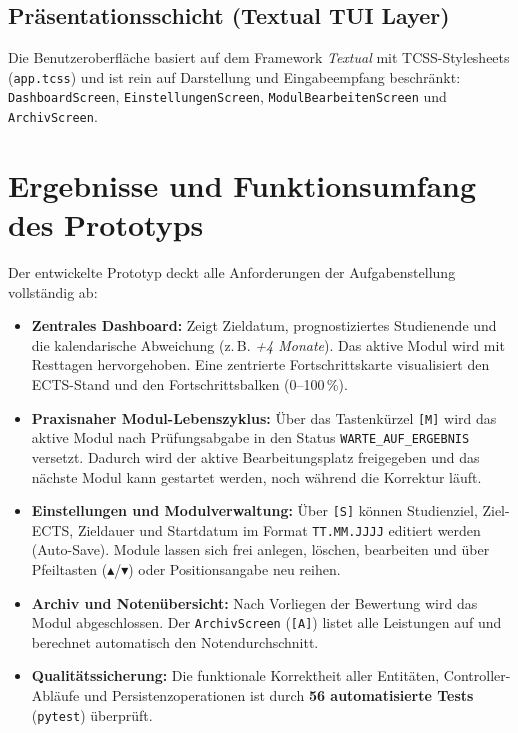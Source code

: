 \documentclass[11pt,a4paper]{article}
\begin{document}
\subsection{Präsentationsschicht (Textual TUI Layer)}
Die Benutzeroberfläche basiert auf dem Framework \textit{Textual} mit TCSS-Stylesheets (\texttt{app.tcss}) und ist rein auf Darstellung und Eingabeempfang beschränkt: \texttt{DashboardScreen}, \texttt{EinstellungenScreen}, \texttt{ModulBearbeitenScreen} und \texttt{ArchivScreen}.

\newpage

\section{Ergebnisse und Funktionsumfang des Prototyps}
Der entwickelte Prototyp deckt alle Anforderungen der Aufgabenstellung vollständig ab:
\begin{itemize}[leftmargin=*,noitemsep,topsep=2pt]
    \item \textbf{Zentrales Dashboard:} Zeigt Zieldatum, prognostiziertes Studienende und die kalendarische Abweichung (z.\,B. \textit{+4 Monate}). Das aktive Modul wird mit Resttagen hervorgehoben. Eine zentrierte Fortschrittskarte visualisiert den ECTS-Stand und den Fortschrittsbalken (0--100\,\%).
    \item \textbf{Praxisnaher Modul-Lebenszyklus:} Über das Tastenkürzel \texttt{[M]} wird das aktive Modul nach Prüfungsabgabe in den Status \texttt{WARTE\_AUF\_ERGEBNIS} versetzt. Dadurch wird der aktive Bearbeitungsplatz freigegeben und das nächste Modul kann gestartet werden, noch während die Korrektur läuft.
    \item \textbf{Einstellungen und Modulverwaltung:} Über \texttt{[S]} können Studienziel, Ziel-ECTS, Zieldauer und Startdatum im Format \texttt{TT.MM.JJJJ} editiert werden (Auto-Save). Module lassen sich frei anlegen, löschen, bearbeiten und über Pfeiltasten ($\blacktriangle$/$\blacktriangledown$) oder Positionsangabe neu reihen.
    \item \textbf{Archiv und Notenübersicht:} Nach Vorliegen der Bewertung wird das Modul abgeschlossen. Der \texttt{ArchivScreen} (\texttt{[A]}) listet alle Leistungen auf und berechnet automatisch den Notendurchschnitt.
    \item \textbf{Qualitätssicherung:} Die funktionale Korrektheit aller Entitäten, Controller-Abläufe und Persistenzoperationen ist durch \textbf{56 automatisierte Tests} (\texttt{pytest}) überprüft.
\end{itemize}
\end{document}

